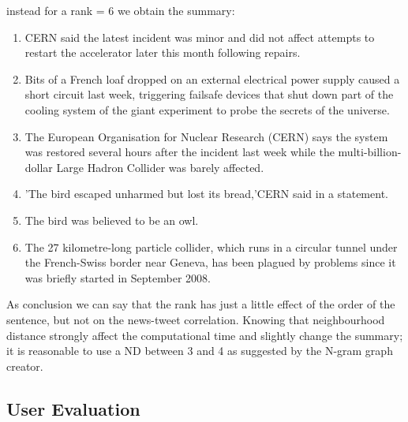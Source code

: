 instead for a rank = 6 we obtain the summary:

\begin{enumerate}
	\item CERN said the latest incident was minor and did not affect attempts to restart the accelerator later this month following repairs.
	\item Bits of a French loaf dropped on an external electrical power supply caused a short circuit last week, triggering failsafe devices that shut down part of the cooling system of the giant experiment to probe the secrets of the universe.
	\item The European Organisation for Nuclear Research (CERN) says the system was restored several hours after the incident last week while the multi-billion-dollar Large Hadron Collider was barely affected.
	\item 'The bird escaped unharmed but lost its bread,'CERN said in a statement. 
	\item The bird was believed to be an owl.
	\item The 27 kilometre-long particle collider, which runs in a circular tunnel under the French-Swiss border near Geneva, has been plagued by problems since it was briefly started in September 2008.
\end{enumerate}

As conclusion we can say that the rank has just a little effect of the order of the sentence, but not on the news-tweet correlation.
Knowing that neighbourhood distance strongly affect the computational time and slightly change the summary; it is reasonable to use a ND between 3 and 4 as suggested by the N-gram graph creator.



\subsection*{User Evaluation}

